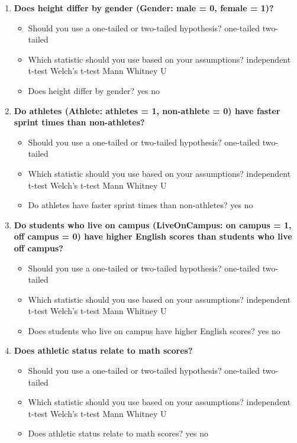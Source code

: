 \documentclass[
]{book}
\begin{document}
\begin{enumerate}
\def\labelenumi{\arabic{enumi}.}
\item
  \textbf{Does height differ by gender (Gender: male = 0, female = 1)?}

  \begin{itemize}
  \item
    Should you use a one-tailed or two-tailed hypothesis? one-tailed two-tailed
  \item
    Which statistic should you use based on your assumptions? independent t-test Welch's t-test Mann Whitney U
  \item
    Does height differ by gender? yes no
  \end{itemize}
\item
  \textbf{Do athletes (Athlete: athletes = 1, non-athlete = 0) have faster sprint times than non-athletes?}

  \begin{itemize}
  \item
    Should you use a one-tailed or two-tailed hypothesis? one-tailed two-tailed
  \item
    Which statistic should you use based on your assumptions? independent t-test Welch's t-test Mann Whitney U
  \item
    Do athletes have faster sprint times than non-athletes? yes no
  \end{itemize}
\item
  \textbf{Do students who live on campus (LiveOnCampus: on campus = 1, off campus = 0) have higher English scores than students who live off campus?}

  \begin{itemize}
  \item
    Should you use a one-tailed or two-tailed hypothesis? one-tailed two-tailed
  \item
    Which statistic should you use based on your assumptions? independent t-test Welch's t-test Mann Whitney U
  \item
    Does students who live on campus have higher English scores? yes no
  \end{itemize}
\item
  \textbf{Does athletic status relate to math scores?}

  \begin{itemize}
  \item
    Should you use a one-tailed or two-tailed hypothesis? one-tailed two-tailed
  \item
    Which statistic should you use based on your assumptions? independent t-test Welch's t-test Mann Whitney U
  \item
    Does athletic status relate to math scores? yes no
  \end{itemize}
\end{enumerate}
\end{document}
